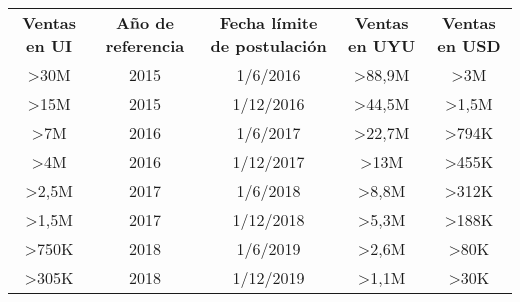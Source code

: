 \begin{tabular}{ccccc}
    \textbf{Ventas en   UI} & \textbf{Año de referencia} & \textbf{Fecha límite de postulación} & \textbf{Ventas en UYU} & \textbf{Ventas en USD} \\
    \textgreater 30M        & 2015                       & 1/6/2016                             & \textgreater 88,9M     & \textgreater 3M        \\
    \textgreater 15M        & 2015                       & 1/12/2016                            & \textgreater 44,5M     & \textgreater 1,5M      \\
    \textgreater 7M         & 2016                       & 1/6/2017                             & \textgreater 22,7M     & \textgreater 794K      \\
    \textgreater 4M         & 2016                       & 1/12/2017                            & \textgreater 13M       & \textgreater 455K      \\
    \textgreater 2,5M       & 2017                       & 1/6/2018                             & \textgreater 8,8M      & \textgreater 312K      \\
    \textgreater 1,5M       & 2017                       & 1/12/2018                            & \textgreater 5,3M      & \textgreater 188K      \\
    \textgreater 750K       & 2018                       & 1/6/2019                             & \textgreater 2,6M      & \textgreater 80K       \\
    \textgreater 305K       & 2018                       & 1/12/2019                            & \textgreater 1,1M      & \textgreater 30K
\end{tabular}
